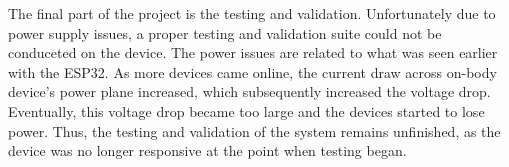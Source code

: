 The final part of the project is the testing and validation.
Unfortunately due to power supply issues, a proper testing and validation suite could not be conduceted on the device.
The power issues are related to what was seen earlier with the ESP32.
As more devices came online, the current draw across on-body device's power plane increased, which subsequently increased the voltage drop.
Eventually, this voltage drop became too large and the devices started to lose power.
Thus, the testing and validation of the system remains unfinished, as the device was no longer responsive at the point when testing began.
